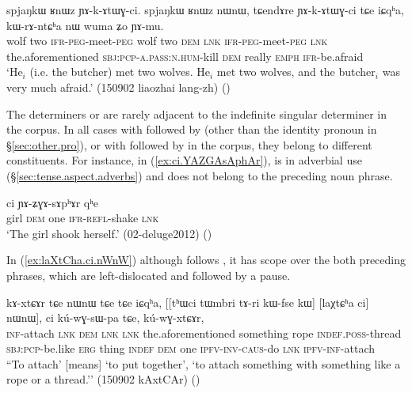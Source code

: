 \begin{exe} 
\ex \label{ex:RnWz.nWnW} 
 \gll spjaŋkɯ ʁnɯz ɲɤ-k-ɤtɯɣ-ci. spjaŋkɯ ʁnɯz nɯnɯ, tɕendɤre ɲɤ-k-ɤtɯɣ-ci tɕe iɕqʰa, kɯ-rɤ-ntɕʰa nɯ wuma ʑo ɲɤ-mu. \\ 
 wolf two \textsc{ifr}-\textsc{peg}-meet-\textsc{peg}  wolf two \textsc{dem} \textsc{lnk} \textsc{ifr}-\textsc{peg}-meet-\textsc{peg} \textsc{lnk} the.aforementioned \textsc{sbj}:\textsc{pcp}-\textsc{a}.\textsc{pass}:\textsc{n}.\textsc{hum}-kill \textsc{dem} really \textsc{emph} \textsc{ifr}-be.afraid \\ 
 \glt `He$_i$ (i.e. the butcher) met two wolves. He$_i$ met two wolves, and the butcher$_i$ was very much afraid.' (150902 liaozhai lang-zh) ()
\end{exe}

The determiners  or  are rarely adjacent to the indefinite singular determiner  in the corpus. In all cases with  followed by  (other than the identity pronoun in §\ref{sec:other.pro}), or with  followed by  in the corpus, they belong to different constituents. For instance, in (\ref{ex:ci.YAZGAsAphAr}),  is in adverbial use (§\ref{sec:tense.aspect.adverbs}) and does not belong to the preceding noun phrase.  

\begin{exe}
\ex \label{ex:ci.YAZGAsAphAr}
\gll [tɕʰeme nɯ] ci ɲɤ-ʑɣɤ-sɤpʰɤr qʰe  \\
girl \textsc{dem} one \textsc{ifr}-\textsc{refl}-shake \textsc{lnk} \\
\glt `The girl shook herself.' (02-deluge2012) ()
\end{exe}

In (\ref{ex:laXtCha.ci.nWnW}) although  follows , it has scope over the both preceding phrases, which are left-dislocated and followed by a pause.

\begin{exe}
\ex \label{ex:laXtCha.ci.nWnW}
\gll  kɤ-xtɕɤr tɕe nɯnɯ tɕe tɕe iɕqʰa, [[tʰɯci tɯmbri tɤ-ri kɯ-fse kɯ] [laχtɕʰa ci] nɯnɯ], ci kú-wɣ-sɯ-pa tɕe, kú-wɣ-xtɕɤr, \\
\textsc{inf}-attach \textsc{lnk} \textsc{dem} \textsc{lnk} \textsc{lnk} the.aforementioned something rope \textsc{indef}.\textsc{poss}-thread \textsc{sbj}:\textsc{pcp}-be.like \textsc{erg} thing \textsc{indef} \textsc{dem} one \textsc{ipfv}-\textsc{inv}-\textsc{caus}-do \textsc{lnk} \textsc{ipfv}-\textsc{inf}-attach \\
\glt ``To attach' [means] `to put together', `to attach something with something like a rope or a thread.''  (150902 kAxtCAr)
()
\end{exe}

